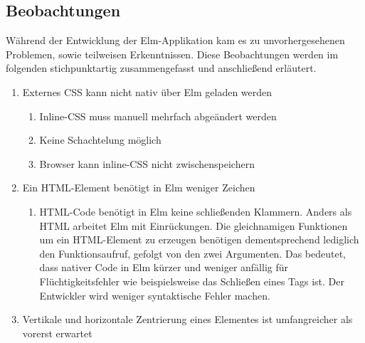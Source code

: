 \subsection{Beobachtungen}
\label{sec:Beobachtungen}
Während der Entwicklung der Elm-Applikation kam es zu unvorhergesehenen Problemen, sowie teilweisen Erkenntnissen. Diese Beobachtungen werden im folgenden stichpunktartig zusammengefasst und anschließend erläutert.
\begin{enumerate}[label*=\arabic*.]

\item Externes \ac{CSS} kann nicht nativ über Elm geladen werden
	\begin{enumerate}[label*=\arabic*.]
		\item Inline-\ac{CSS} muss manuell mehrfach abgeändert werden
		\item Keine Schachtelung möglich
		\item Browser kann inline-\ac{CSS} nicht zwischenspeichern
	\end{enumerate}
\item Ein \ac{HTML}-Element benötigt in Elm weniger Zeichen
	\begin{enumerate}[label*=\arabic*.]
		\item \ac{HTML}-Code benötigt in Elm keine schließenden Klammern. Anders als \ac{HTML} arbeitet Elm mit Einrückungen. Die gleichnamigen Funktionen um ein \ac{HTML}-Element zu erzeugen benötigen dementsprechend lediglich den Funktionsaufruf, gefolgt von den zwei Argumenten. Das bedeutet, dass nativer Code in Elm kürzer und weniger anfällig für Flüchtigkeitsfehler wie beispielsweise das Schließen eines Tags ist. Der Entwickler wird weniger syntaktische Fehler machen.
	\end{enumerate}
\item Vertikale und horizontale Zentrierung eines Elementes ist umfangreicher als vorerst erwartet
	\begin{enumerate}[label*=\arabic*.]

\end{enumerate}
\end{enumerate}
